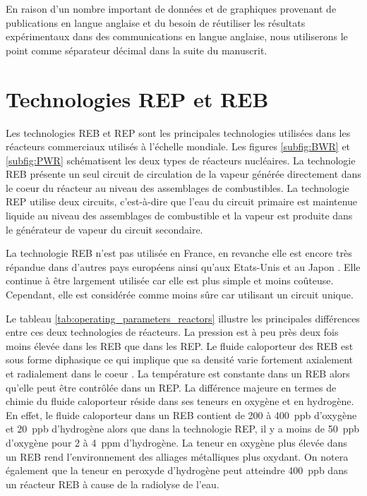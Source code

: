 \begin{refsection}
    En raison d'un nombre important de données et de graphiques provenant de publications en langue 
    anglaise et du besoin de réutiliser les résultats expérimentaux dans des communications en langue anglaise,
    nous utiliserons le point comme séparateur décimal dans la suite du manuscrit.


\section{Technologies REP et REB}\label{sec:power_reactors}

	Les technologies REB et REP sont les principales technologies utilisées dans les réacteurs commerciaux utilisés à
    l'échelle mondiale.
    Les figures
    \ref{subfig:BWR} et \ref{subfig:PWR} schématisent les deux types de réacteurs
    nucléaires. La technologie REB présente un seul circuit de circulation de la vapeur
    générée directement dans le coeur du réacteur au niveau des assemblages de combustibles.
    La technologie REP utilise deux circuits, c'est-à-dire que l'eau du circuit primaire est maintenue liquide au niveau
    des assemblages de combustible et la vapeur est produite dans le générateur
    de vapeur du circuit secondaire. 

    La technologie REB n'est pas utilisée en France, en revanche elle est encore
    très répandue dans d'autres pays européens ainsi qu'aux Etats-Unis et au
    Japon \citep{Pradel2008}. Elle continue à être largement
    utilisée car elle est plus simple et moins coûteuse. Cependant, elle est considérée comme moins sûre
    car utilisant un circuit unique.

    Le tableau \ref{tab:operating_parameters_reactors} illustre les principales
    différences entre ces deux technologies de réacteurs. La pression est à peu
    près deux fois moins élevée dans les REB que dans les REP.
    Le fluide caloporteur des REB est sous forme diphasique ce qui implique que
    sa densité varie fortement axialement et radialement dans
    le coeur \citep{Pradel2008}. La température est constante dans
    un REB alors qu’elle peut être contrôlée dans un REP. La différence
    majeure en termes de chimie du fluide caloporteur réside dans ses teneurs en oxygène et en
    hydrogène. En effet, le fluide caloporteur dans un REB contient de 200 à
    400~ppb d’oxygène et 20~ppb d’hydrogène alors que dans la
    technologie REP, il y a moins de 50~ppb d’oxygène pour 2 à 4~ppm d’hydrogène. La
    teneur en oxygène plus élevée dans un REB rend l’environnement des alliages métalliques plus oxydant. On notera
    également que la teneur
    en peroxyde d'hydrogène peut atteindre 400~ppb dans un réacteur REB à cause de la radiolyse de l'eau.


\end{refsection}
